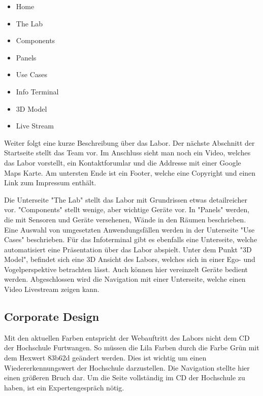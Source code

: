 \begin{itemize}
	\item Home
	
	\item The Lab 
	
	\item Components 
	
	\item Panels
	
	\item Use Cases 
	
	\item Info Terminal
	
	\item 3D Model
	
	\item Live Stream
	
	
	
\end{itemize}

Weiter folgt eine kurze Beschreibung über das Labor. Der nächste Abschnitt der Startseite stellt das Team vor. Im Anschluss sieht man noch ein Video, welches das Labor vorstellt, ein Kontaktforumlar und die Addresse mit einer Google Maps Karte. Am untersten Ende ist ein Footer, welche eine Copyright und einen Link zum Impressum enthält.

Die Unterseite "The Lab" stellt das Labor mit Grundrissen etwas detailreicher vor. "Components" stellt wenige, aber wichtige Geräte vor. In "Panels" werden, die mit Sensoren und Geräte versehenen, Wände in den Räumen beschrieben. Eine Auswahl von umgesetzten Anwendungsfällen werden in der Unterseite "Use Cases" beschrieben. Für das Infoterminal gibt es ebenfalls eine Unterseite, welche automatisiert eine Präsentation über das Labor abspielt. Unter dem Punkt "3D Model", befindet sich eine 3D Ansicht des Labors, welches sich in einer Ego- und Vogelperspektive betrachten lässt. Auch können hier vereinzelt Geräte bedient werden. Abgeschlossen wird die Navigation mit einer Unterseite, welche einen Video Livestream zeigen kann.

 

\subsection{Corporate Design}
Mit den aktuellen Farben entspricht der Webauftritt des Labors nicht dem \ac{CD} der Hochschule Furtwangen. So müssen die Lila Farben durch die Farbe Grün mit dem Hexwert 83b62d geändert werden. Dies ist wichtig um einen Wiedererkennungswert der Hochschule darzustellen. Die Navigation stellte hier einen größeren Bruch dar. Um die Seite vollständig im \ac{CD} der Hochschule zu haben, ist ein Expertengespräch nötig.



